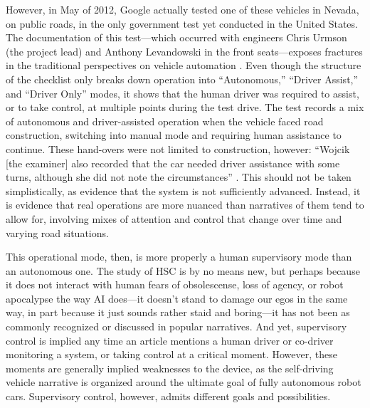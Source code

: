 However, in May of 2012,
Google actually tested one of these vehicles in Nevada, on public
roads, in the only government test yet conducted in the United States.
The documentation of this test---which occurred with engineers Chris
Urmson (the project lead) and Anthony Levandowski in the front
seats---exposes fractures in the traditional perspectives on vehicle
automation \cite{harrisNevada}. Even though the structure of the
checklist only breaks down operation into ``Autonomous,'' ``Driver
Assist,'' and ``Driver Only'' modes, it shows that the human driver
was required to assist, or to take control, at multiple points during
the test drive. The test records a mix of autonomous and
driver-assisted operation when the vehicle faced road construction,
switching into manual mode and requiring human assistance to continue.
These hand-overs were not limited to construction, however: 
``Wojcik [the examiner] also recorded that the car needed driver
assistance with some turns, although she did not note the
circumstances'' \cite{harrisNevada}. This should not be taken
simplistically, as evidence that the system is not sufficiently
advanced. Instead, it is evidence that real operations are more
nuanced than narratives of them tend to allow for, involving mixes of
attention and control that change over time and varying road situations.

This operational mode, then, is more properly a human supervisory mode
than an autonomous one. The study of HSC is by no means new, but
perhaps because it does not interact with human fears of obsolescense,
loss of agency, or robot apocalypse the way AI does---it doesn't stand
to damage our egos in the same way, in part because it just
sounds rather staid and boring---it has not been as commonly
recognized or discussed in popular narratives. And yet, supervisory
control is implied any time an article mentions a human driver or
co-driver monitoring a system, or taking control at a critical moment.
However, these moments are generally implied weaknesses to the device,
as the self-driving vehicle narrative is organized around the ultimate
goal of fully autonomous robot cars. Supervisory control, however,
admits different goals and possibilities.

